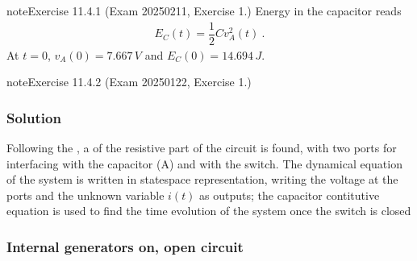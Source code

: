 \documentclass[letterpaper,10pt,english]{jupyterBook}
\begin{document}
\begin{sphinxadmonition}{note}{Exercise 11.4.1 (Exam 2025\sphinxhyphen{}02\sphinxhyphen{}11, Exercise 1.)}
\sphinxAtStartPar
{} Energy in the capacitor reads
\begin{equation*}
\begin{split}E_C(t) = \dfrac{1}{2} C v_A^2(t) \ .\end{split}
\end{equation*}
\sphinxAtStartPar
At \(t = 0\), \(v_A(0) = 7.667 \, V\) and \(E_C(0) = 14.694 \, J \).
\end{sphinxadmonition}


 \label{exercise:exam-25-01-22-exe-01}

\begin{sphinxadmonition}{note}{Exercise 11.4.2 (Exam 2025\sphinxhyphen{}01\sphinxhyphen{}22, Exercise 1.)}



\begin{figure}[htbp]
\centering

\noindent{}
\end{figure}
\subsubsection*{Solution}

\sphinxAtStartPar
Following the , a {\hyperref[\detokenize{ch/electrical-engineering-networks-linear:classical-electromagnetism-electrical-engineering-newtork-analysis-thevenin-n-port}]{}} of the resistive part of the circuit is found, with two ports for interfacing with the capacitor (A) and with the switch. The dynamical equation of the system is written in state\sphinxhyphen{}space representation, writing the voltage at the ports and the unknown variable \(i(t)\) as outputs; the capacitor contitutive equation is used to find the time evolution of the system once the switch is closed



\begin{figure}[htbp]
\centering

\noindent{}
\end{figure}
\subsubsection*{Internal generators on, open circuit}


\end{sphinxadmonition}
\end{document}
